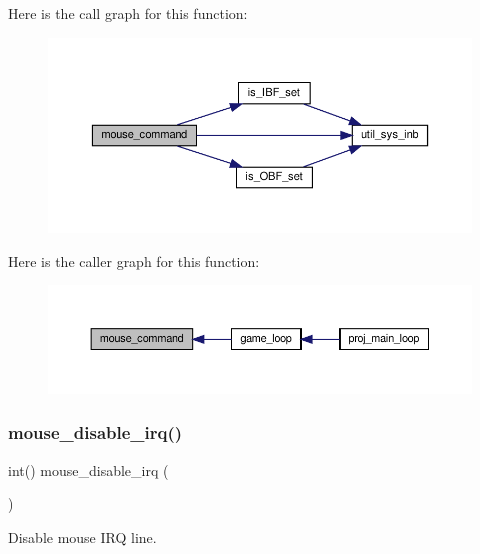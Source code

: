 Here is the call graph for this function\+:
\nopagebreak
\begin{figure}[H]
\begin{center}
\leavevmode
\includegraphics[width=350pt]{group__mouse_gacbf0aed06c0dbd0869075d318adf3147_cgraph}
\end{center}
\end{figure}
Here is the caller graph for this function\+:
\nopagebreak
\begin{figure}[H]
\begin{center}
\leavevmode
\includegraphics[width=350pt]{group__mouse_gacbf0aed06c0dbd0869075d318adf3147_icgraph}
\end{center}
\end{figure}
\mbox{\label{group__mouse_gaab2e4485c75ef16ea9fbd7662bf12e23}} 
\subsubsection{\texorpdfstring{mouse\+\_\+disable\+\_\+irq()}{mouse\_disable\_irq()}}
{\footnotesize\ttfamily int() mouse\+\_\+disable\+\_\+irq (\begin{DoxyParamCaption}{ }\end{DoxyParamCaption})}



Disable mouse I\+RQ line. 

